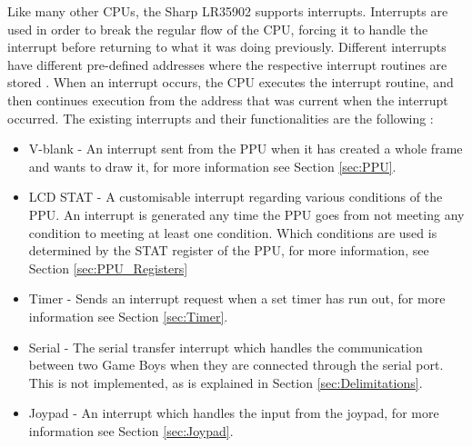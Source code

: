 Like many other CPUs, the Sharp LR35902 supports interrupts. Interrupts are used in order to break the regular flow of the CPU, forcing it to handle the interrupt before returning to what it was doing previously.
Different interrupts have different pre-defined addresses where the respective interrupt routines are stored \cite{pandocsinterrupts}. When an interrupt occurs, the CPU executes the interrupt routine, and then continues execution from the address that was current when the interrupt occurred. The existing interrupts and their functionalities are the following \cite{pandocsinterrupts}:
\\
\begin{itemize}
    \item V-blank - An interrupt sent from the PPU when it has created a whole frame and wants to draw it, for more information see Section \ref{sec:PPU}.
    \item LCD STAT - A customisable interrupt regarding various conditions of the PPU. An interrupt is generated any time the PPU goes from not meeting any condition to meeting at least one condition. Which conditions are used is determined by the STAT register of the PPU, for more information, see Section \ref{sec:PPU_Registers}
    \item Timer - Sends an interrupt request when a set timer has run out, for more information see Section \ref{sec:Timer}.
    \item Serial - The serial transfer interrupt which handles the communication between two Game Boys when they are connected through the serial port. This is not implemented, as is explained in Section \ref{sec:Delimitations}.
    \item Joypad - An interrupt which handles the input from the joypad, for more information see Section \ref{sec:Joypad}.
    \\
\end{itemize}

